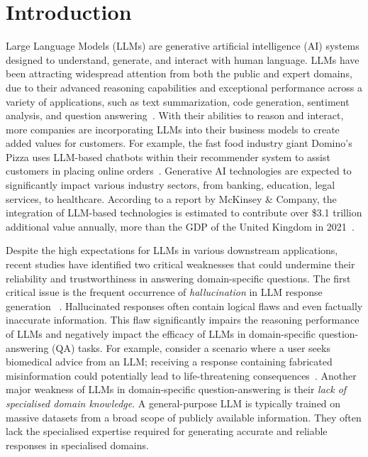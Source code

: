 \section*{Introduction}\label{sec:introduction}

Large Language Models (LLMs) are generative artificial intelligence (AI) systems designed to understand, generate, and interact with human language. 
LLMs have been attracting widespread attention from both the public and expert domains, due to their advanced reasoning capabilities and exceptional performance across a variety of applications, such as text summarization, code generation, sentiment analysis, and question answering~\parencite{brown2020language, zero-shot-reasoner, palm, won2024scaling}.
With their abilities to reason and interact, more companies are incorporating LLMs into their business models to create added values for customers. 
For example, the fast food industry giant Domino's Pizza uses LLM-based chatbots within their recommender system
to assist customers in placing online orders~\parencite{dominos_ai}.
Generative AI technologies are expected to significantly impact various industry sectors, from banking, education, legal services, to healthcare. According to a report by McKinsey \& Company, the integration of LLM-based technologies is estimated to contribute over \$3.1 trillion additional value annually, more than the GDP of the United Kingdom in 2021~\parencite{mkinsey}.

Despite the high expectations for LLMs in various downstream applications, recent studies have identified two critical weaknesses that could undermine their reliability and trustworthiness in answering domain-specific questions.
The first critical issue is the frequent occurrence of \emph{hallucination} in LLM response generation
~\parencite{kgr, kalm-prompting, huang2023survey, ji2023survey}. 
Hallucinated responses often contain logical flaws and even factually inaccurate information.
This flaw significantly impairs the reasoning performance of LLMs and negatively impact the efficacy of LLMs in domain-specific question-answering (QA) tasks.
For example, consider a scenario where a user seeks biomedical advice from an LLM; receiving a response containing fabricated misinformation could potentially lead to life-threatening consequences~\parencite{pmc-llama}.
Another major weakness of LLMs in domain-specific question-answering is their \emph{lack of specialised domain knowledge}.
A general-purpose LLM is typically trained on massive datasets from a broad scope of publicly available information. They often lack the specialised expertise required for generating accurate and reliable responses in specialised domains.

